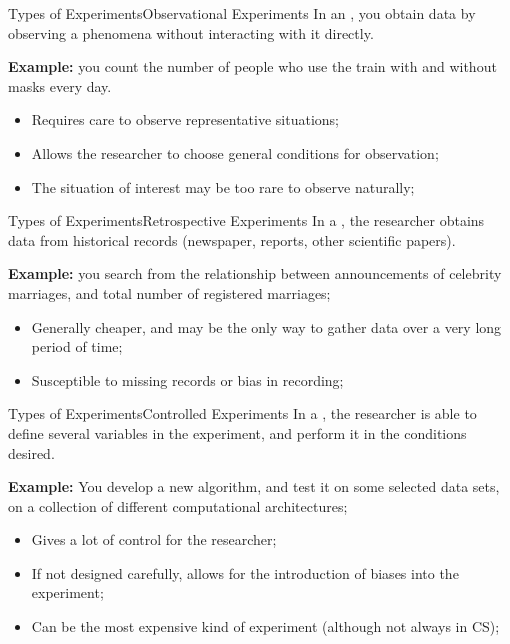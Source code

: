 \begin{frame}{Types of Experiments}{Observational Experiments}
  In an , you obtain data by observing a phenomena without interacting with it directly.
  \bigskip

  {\bf Example:} you count the number of people who use the train with and without masks every day.
  \bigskip

  \begin{itemize}
    \item Requires care to observe representative situations;
    \item Allows the researcher to choose general conditions for observation;
    \item The situation of interest may be too rare to observe naturally;
  \end{itemize}
\end{frame}

\begin{frame}{Types of Experiments}{Retrospective Experiments}
  In a , the researcher obtains data from historical records (newspaper, reports, other scientific papers).\bigskip

  {\bf Example:} you search from the relationship between announcements of celebrity marriages, and total number of registered marriages;\bigskip

  \begin{itemize}
    \item Generally cheaper, and may be the only way to gather data over a very long period of time;
    \item Susceptible to missing records or bias in recording;
  \end{itemize}
\end{frame}

\begin{frame}{Types of Experiments}{Controlled Experiments}
  In a , the researcher is able to define several variables in the experiment, and perform it in the conditions desired.\bigskip

  {\bf Example:} You develop a new algorithm, and test it on some selected data sets, on a collection of different computational architectures;\bigskip

  \begin{itemize}
    \item Gives a lot of control for the researcher;
    \item If not designed carefully, allows for the introduction of biases into the experiment;
    \item Can be the most expensive kind of experiment (although not always in CS);
  \end{itemize}
\end{frame}


